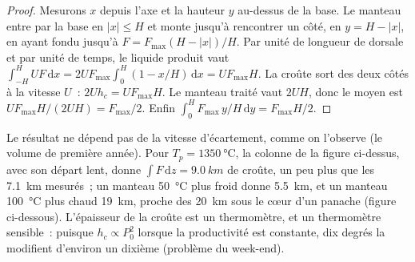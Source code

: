 \begin{proof}
Mesurons $x$ depuis l'axe et la hauteur $y$ au-dessus de la base. Le manteau entre par la base
en $|x| \le H$ et monte jusqu'à rencontrer un côté, en $y = H - |x|$, en ayant fondu jusqu'à
$F = F_{\max}(H - |x|)/H$. Par unité de longueur de dorsale et par unité de temps, le liquide produit vaut
$\int_{-H}^{H} U F\,\mathrm dx = 2UF_{\max}\int_0^H (1 - x/H)\,\mathrm dx =
UF_{\max}H$. La croûte sort des deux côtés à la vitesse $U$~: $2Uh_c = UF_{\max}H$.
Le manteau traité vaut $2UH$, donc le  moyen est $UF_{\max}H/(2UH) =
F_{\max}/2$. Enfin $\int_0^H F_{\max}\,y/H\,\mathrm dy = F_{\max}H/2$.
\end{proof}

Le résultat ne dépend pas de la vitesse d'écartement, comme on l'observe (le volume de
première année). Pour $T_p = \qty{1350}{\celsius}$, la colonne de la figure ci-dessus, avec son
départ lent, donne $\int F\,\mathrm dz = \qty{9.0}{km}$ de croûte, un peu plus que les
\qty{7.1}{km} mesurés~; un manteau \qty{50}{\celsius} plus froid donne
\qty{5.5}{km}, et un manteau \qty{100}{\celsius} plus chaud \qty{19}{km}, proche des
\qty{20}{km} sous le cœur d'un panache (figure ci-dessous). L'épaisseur de la croûte est un
thermomètre, et un thermomètre sensible~: puisque $h_c \propto P_0^2$ lorsque la productivité est
constante, dix degrés la modifient d'environ un dixième (problème du week-end).

